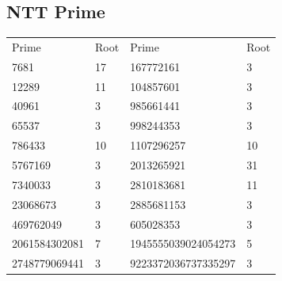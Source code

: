 \subsection{NTT Prime}
\begin{tabular}{ l l l l }
    Prime & Root & Prime & Root \\
    7681  &   17 & 167772161 & 3 \\
    12289 & 11 & 104857601 & 3 \\
    40961 & 3 & 985661441 & 3 \\
    65537 & 3 & 998244353 & 3 \\   
    786433 & 10 & 1107296257 & 10 \\
    5767169 & 3 & 2013265921 & 31 \\
    7340033 & 3 & 2810183681 & 11 \\
    23068673 & 3 & 2885681153 & 3 \\
    469762049 & 3 & 605028353 & 3 \\
    2061584302081 & 7 & 1945555039024054273 & 5 \\
    2748779069441 & 3 & 9223372036737335297 & 3
\end{tabular}